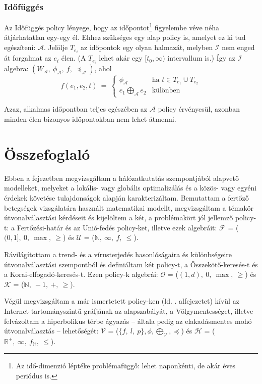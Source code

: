       \subsubsection{Időfüggés}
      Az Időfüggés policy lényege, hogy az időpontot\footnote{Az idő-dimenzió léptéke problémafüggő: lehet naponkénti, de akár éves periódus is.} figyelembe véve néha átjárhatatlan egy-egy él. Ehhez szükséges egy alap policy is, amelyet ez ki tud egészíteni: $\mathcal{A}$. Jelölje $T_{e_i}$ az időpontok egy olyan halmazát, melyben $\mathcal{I}$ nem enged át forgalmat az $e_i$ élen. (A $T_{e_i}$ lehet akár egy $[t_0, \infty)$ intervallum is.) Így az $\mathcal{I}$ algebra: $(W_{\mathcal{A}},~\phi_{\mathcal{A}},~f,~\preceq_{\mathcal{A}})$, ahol
      $$f(e_1,e_2,t)~=~
      \begin{cases}
        \phi_{\mathcal{A}} & \text{ha } t \in T_{e_1} \cup T_{e_2}\\
        e_1 \bigoplus_{\mathcal{A}} e_2 & \text{különben}
      \end{cases}$$

      Azaz, alkalmas időpontban teljes egészében az $\mathcal{A}$ policy érvényesül, azonban minden élen bizonyos időpontokban nem lehet átmenni.\\

  \section{Összefoglaló}
  Ebben a fejezetben megvizsgáltam a hálózatkutatás szempontjából alapvető modelleket, melyeket a lokális- vagy globális optimalizálás és a közös- vagy egyéni érdekek követése tulajdonságok alapján karakterizáltam. Bemutattam a fertőző betegségek vizsgálatára használt matematikai modellt, megvizsgáltam a témakör útvonalválasztási kérdéseit és kijelöltem a két, a problémakört jól jellemző policy-t: a Fertőzési-határ és az Unió-fedés policy-ket, illetve ezek algebráit: $\mathcal{F}$ = ($(0,1],~0,~\max,~\geq$) és $\mathcal{U}$ = ($\mathbb{N},~\infty,~f,~\leq$).

  Rávilágítottam a trend- és a vírusterjedés hasonlóságaira és különbségeire útvonalválasztási szempontból és definiáltam két policy-t, a Összekötő-keresés-t és a Korai-elfogadó-keresés-t. Ezen policy-k algebrái: $\mathcal{O}$ = ($(1,d),~0,~\max,~\geq$) és $\mathcal{K}$ = ($\mathbb{N},~-1,~+,~\geq$).

  Végül megvizsgáltam a már ismertetett policy-ken (ld. . alfejezetet) kívül az Internet tartományszintű gráfjának az alapszabályát, a Völgymentességet, illetve felvázoltam a hiperbolikus térbe ágyazás -- általa pedig az elakadásmentes mohó útvonalválasztás -- lehetőségét: $\mathcal{V}$ = ($\{f,~l,~p\},\phi,\bigoplus_{\mathcal{V}},\preceq$) és $\mathcal{H}$ = ($\mathbb{R}^{+},~\infty,~f_{\mathbb{H}},~\leq$).
